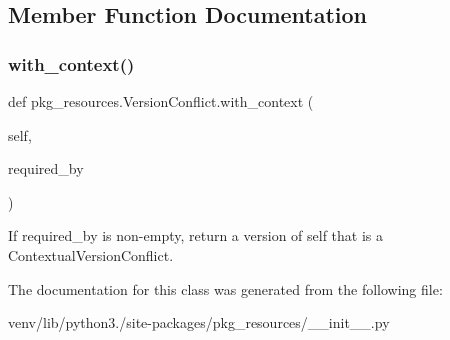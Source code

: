 \subsection{Member Function Documentation}
\mbox{\label{classpkg__resources_1_1_version_conflict_a72f5accef580cb14e1f08211a22e114f}} 
\subsubsection{\texorpdfstring{with\+\_\+context()}{with\_context()}}
{\footnotesize\ttfamily def pkg\+\_\+resources.\+Version\+Conflict.\+with\+\_\+context (\begin{DoxyParamCaption}\item[{}]{self,  }\item[{}]{required\+\_\+by }\end{DoxyParamCaption})}

\begin{DoxyVerb}If required_by is non-empty, return a version of self that is a
ContextualVersionConflict.
\end{DoxyVerb}
 

The documentation for this class was generated from the following file\+:\begin{DoxyCompactItemize}
\item 
venv/lib/python3./site-\/packages/pkg\+\_\+resources/\+\_\+\+\_\+init\+\_\+\+\_\+.\+py\end{DoxyCompactItemize}
